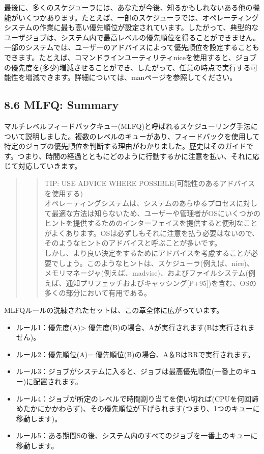 最後に、多くのスケジューラには、あなたが今後、知るかもしれないある他の機能がいくつかあります。たとえば、一部のスケジューラでは、オペレーティングシステムの作業に最も高い優先順位が設定されています。したがって、典型的なユーザジョブは、システム内で最高レベルの優先順位を得ることができません。一部のシステムでは、ユーザーのアドバイスによって優先順位を設定することもできます。たとえば、コマンドラインユーティリティniceを使用すると、ジョブの優先度を(多少)増減させることができ、したがって、任意の時点で実行する可能性を増減できます。詳細については、manページを参照してください。

\hypertarget{mlfq-summary}{%
\subsection*{8.6 MLFQ: Summary}\label{mlfq-summary}}

マルチレベルフィードバックキュー(MLFQ)と呼ばれるスケジューリング手法について説明しました。複数のレベルのキューがあり、フィードバックを使用して特定のジョブの優先順位を判断する理由がわかりました。歴史はそのガイドです。つまり、時間の経過とともにどのように行動するかに注意を払い、それに応じて対応していきます。

\begin{quote}
\begin{quote}
TIP: USE ADVICE WHERE POSSIBLE(可能性のあるアドバイスを使用する)\\
オペレーティングシステムは、システムのあらゆるプロセスに対して最適な方法は知らないため、ユーザーや管理者がOSにいくつかのヒントを提供するためのインターフェイスを提供すると便利なことがよくあります。OSは必ずしもそれに注意を払う必要はないので、そのようなヒントのアドバイスと呼ぶことが多いです。\\
しかし、より良い決定をするためにアドバイスを考慮することが必要でしょう。このようなヒントは、スケジューラ(例えば、nice)、メモリマネージャ(例えば、madvise)、およびファイルシステム(例えば、通知プリフェッチおよびキャッシング{[}P+95{]})を含む、OSの多くの部分において有用である。
\end{quote}
\end{quote}

MLFQルールの洗練されたセットは、この章全体に広がっています。

\begin{itemize}
\tightlist
\item
  ルール1：優先度(A)\textgreater{}
  優先度(B)の場合、Aが実行されます(Bは実行されません)。
\item
  ルール2：優先順位(A)= 優先順位(B)の場合、A＆BはRRで実行されます。
\item
  ルール3：ジョブがシステムに入ると、ジョブは最高優先順位(一番上のキュー)に配置されます。
\item
  ルール4：ジョブが所定のレベルで時間割り当てを使い切れば(CPUを何回諦めたかにかかわらず)、その優先順位が下げられます(つまり、1つのキューに移動します)。
\item
  ルール5：ある期間Sの後、システム内のすべてのジョブを一番上のキューに移動します。
\end{itemize}

